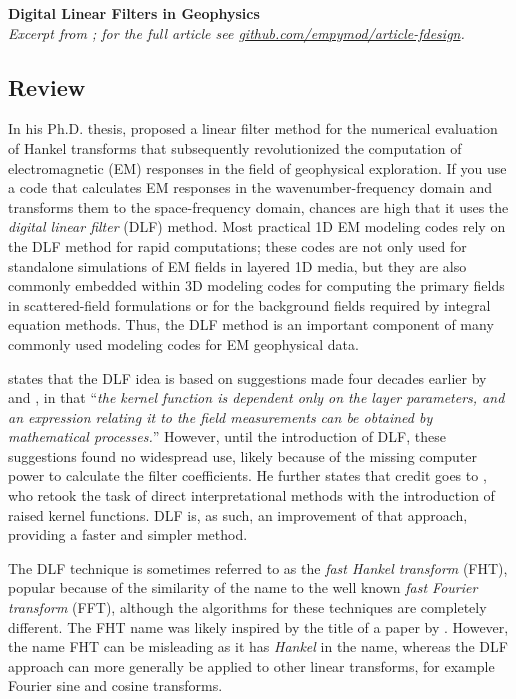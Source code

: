 \documentclass[a4paper, twoside, parskip, 10pt]{scrartcl}
\begin{document}
\thispagestyle{empty}

{\huge \bf \sffamily Digital Linear Filters in Geophysics\\[.5cm]}
{\small\emph{Excerpt from \cite{GEO.18.Werthmuller}; for the full article see
\href{https://github.com/empymod/article-fdesign}{github.com/empymod/article-fdesign}.}}

\vspace{.5cm}

\begin{multicols}{2}

\section{Review}

In his Ph.D. thesis, \cite{PhD.70.Ghosh} proposed a linear filter method for
the numerical evaluation of Hankel transforms that subsequently revolutionized
the computation of electromagnetic (EM) responses in the field of geophysical
exploration. If you use a code that calculates EM responses in the
wavenumber-frequency domain and transforms them to the space-frequency domain,
chances are high that it uses the \emph{digital linear filter} (DLF) method.
Most practical 1D EM modeling codes rely on the DLF method for rapid
computations; these codes are not only used for standalone simulations of EM
fields in layered 1D media, but they are also commonly embedded within 3D
modeling codes for computing the primary fields in scattered-field formulations
or for the background fields required by integral equation methods. Thus, the
DLF method is an important component of many commonly used modeling codes for
EM geophysical data.

\cite{GP.71.Ghosh} states that the DLF idea is based on suggestions made four
decades earlier by \cite{PHY.33.Slichter} and \cite{GEO.40.Pekeris}, in that
``\emph{the kernel function is dependent only on the layer parameters, and an
expression relating it to the field measurements can be obtained by
mathematical processes.}'' However, until the introduction of DLF, these
suggestions found no widespread use, likely because of the missing computer
power to calculate the filter coefficients. He further states that credit goes
to \cite{BK.68.Koefoed, GP.70.Koefoed}, who retook the task of direct
interpretational methods with the introduction of raised kernel functions. DLF
is, as such, an improvement of that approach, providing a faster and simpler
method.

The DLF technique is sometimes referred to as the \emph{fast Hankel transform}
(FHT), popular because of the similarity of the name to the well known
\emph{fast Fourier transform} (FFT), although the algorithms for these
techniques are completely different. The FHT name was likely inspired by the
title of a paper by \cite{GP.79.Johansen}. However, the name FHT can be
misleading as it has \emph{Hankel} in the name, whereas the DLF approach can
more generally be applied to other linear transforms, for example Fourier sine
and cosine transforms.


\end{multicols}
\end{document}

